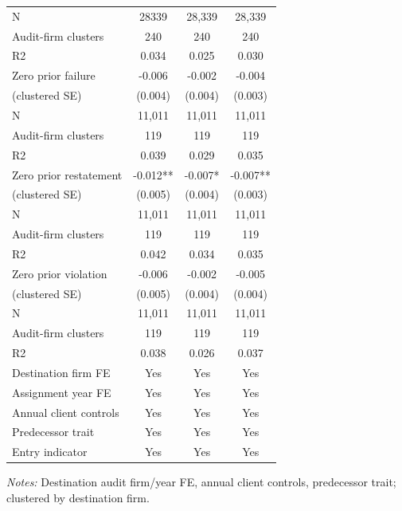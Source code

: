 \documentclass[10pt]{article}
\begin{document}
\begin{minipage}{19cm}
\begin{threeparttable}
\begin{tabular}{p{}ccc}
N & 28339 & 28,339 & 28,339 \\
Audit-firm clusters & 240 & 240 & 240 \\
R2 & 0.034 & 0.025 & 0.030 \\
Zero prior failure & -0.006 & -0.002 & -0.004 \\
(clustered SE) & (0.004) & (0.004) & (0.003) \\
N & 11,011 & 11,011 & 11,011 \\
Audit-firm clusters & 119 & 119 & 119 \\
R2 & 0.039 & 0.029 & 0.035 \\
Zero prior restatement & -0.012** & -0.007* & -0.007** \\
(clustered SE) & (0.005) & (0.004) & (0.003) \\
N & 11,011 & 11,011 & 11,011 \\
Audit-firm clusters & 119 & 119 & 119 \\
R2 & 0.042 & 0.034 & 0.035 \\
Zero prior violation & -0.006 & -0.002 & -0.005 \\
(clustered SE) & (0.005) & (0.004) & (0.004) \\
N & 11,011 & 11,011 & 11,011 \\
Audit-firm clusters & 119 & 119 & 119 \\
R2 & 0.038 & 0.026 & 0.037 \\
Destination firm FE & Yes & Yes & Yes \\
Assignment year FE & Yes & Yes & Yes \\
Annual client controls & Yes & Yes & Yes \\
Predecessor trait & Yes & Yes & Yes \\
Entry indicator & Yes & Yes & Yes \\
\bottomrule
\end{tabular}
\begin{tablenotes}\fontsize{9}{11}\selectfont
\item \raggedright \fontsize{9}{11}\selectfont \textit{Notes:} Destination audit firm/year FE, annual client controls, predecessor trait; clustered by destination firm.
\end{tablenotes}
\end{threeparttable}

\end{minipage}
\end{document}
